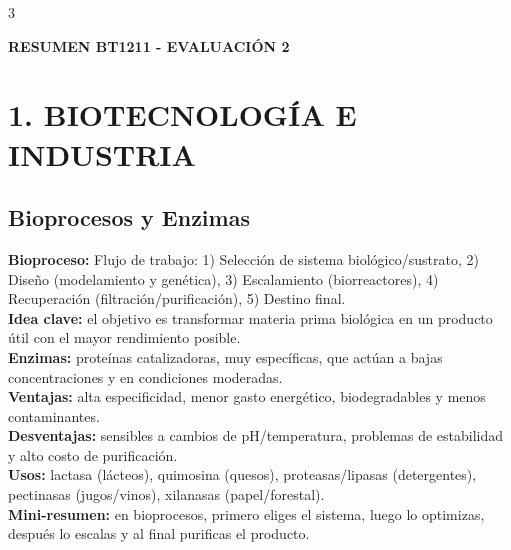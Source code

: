 \documentclass[9pt,landscape,letterpaper]{extarticle}
\begin{document}
\footnotesize
\begin{multicols*}{3}
	\raggedright %

	\begin{center}
		\textbf{\Large RESUMEN BT1211 - EVALUACIÓN 2}
	\end{center}

	\section{1. BIOTECNOLOGÍA E INDUSTRIA}

	\subsection{Bioprocesos y Enzimas}
	\textbf{Bioproceso:} Flujo de trabajo: 1) Selección de sistema biológico/sustrato, 2) Diseño (modelamiento y genética), 3) Escalamiento (biorreactores), 4) Recuperación (filtración/purificación), 5) Destino final.\\
	\textbf{Idea clave:} el objetivo es transformar materia prima biológica en un producto útil con el mayor rendimiento posible.\\
	\textbf{Enzimas:} proteínas catalizadoras, muy específicas, que actúan a bajas concentraciones y en condiciones moderadas.\\
	\textbf{Ventajas:} alta especificidad, menor gasto energético, biodegradables y menos contaminantes.\\
	\textbf{Desventajas:} sensibles a cambios de pH/temperatura, problemas de estabilidad y alto costo de purificación.\\
	\textbf{Usos:} lactasa (lácteos), quimosina (quesos), proteasas/lipasas (detergentes), pectinasas (jugos/vinos), xilanasas (papel/forestal).\\
	\textbf{Mini-resumen:} en bioprocesos, primero eliges el sistema, luego lo optimizas, después lo escalas y al final purificas el producto.


\end{multicols*}
\end{document}

